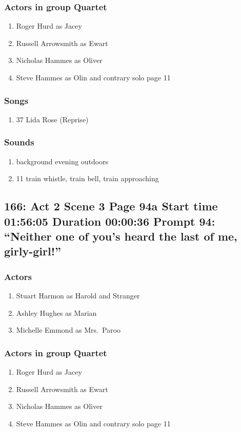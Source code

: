 \subsubsection{Actors in group Quartet}
\begin{enumerate}
\item Roger Hurd as Jacey
\item Russell Arrowsmith as Ewart
\item Nicholas Hammes as Oliver
\item Steve Hammes as Olin and contrary solo page 11
\end{enumerate}

\subsubsection{Songs}
\begin{enumerate}
\item 37 Lida Rose (Reprise)
\end{enumerate}\subsubsection{Sounds}
\begin{enumerate}
\item background evening outdoors
\item 11 train whistle, train bell, train approaching
\end{enumerate}
\subsection{166: Act 2 Scene 3 Page 94a Start time 01:56:05 Duration 00:00:36 Prompt 94: ``Neither one of you's heard the last of me, girly-girl!''}

\subsubsection{Actors}
\begin{enumerate}
\item Stuart Harmon as Harold and Stranger
\item Ashley Hughes as Marian
\item Michelle Emmond as Mrs.~Paroo
\end{enumerate}
\subsubsection{Actors in group Quartet}
\begin{enumerate}
\item Roger Hurd as Jacey
\item Russell Arrowsmith as Ewart
\item Nicholas Hammes as Oliver
\item Steve Hammes as Olin and contrary solo page 11
\end{enumerate}

